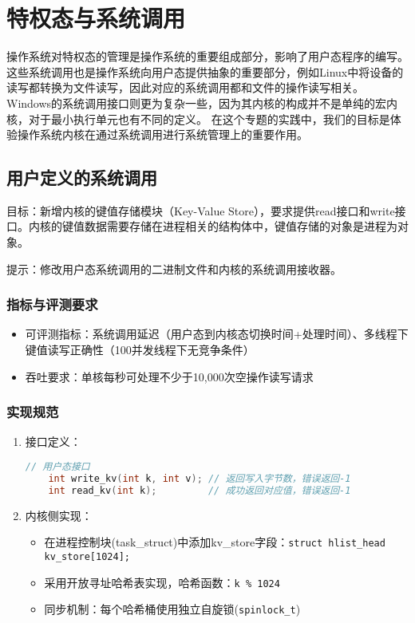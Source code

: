 \chapter{特权态与系统调用}
操作系统对特权态的管理是操作系统的重要组成部分，影响了用户态程序的编写。
这些系统调用也是操作系统向用户态提供抽象的重要部分，例如Linux中将设备的读写都转换为文件读写，因此对应的系统调用都和文件的操作读写相关。Windows的系统调用接口则更为复杂一些，因为其内核的构成并不是单纯的宏内核，对于最小执行单元也有不同的定义。
在这个专题的实践中，我们的目标是体验操作系统内核在通过系统调用进行系统管理上的重要作用。


\section{用户定义的系统调用}
目标：新增内核的键值存储模块（Key-Value Store），要求提供read接口和write接口。内核的键值数据需要存储在进程相关的结构体中，键值存储的对象是进程为对象。

提示：修改用户态系统调用的二进制文件和内核的系统调用接收器。

\subsection*{指标与评测要求}
\begin{itemize}
    \item 可评测指标：系统调用延迟（用户态到内核态切换时间+处理时间）、多线程下键值读写正确性（100并发线程下无竞争条件）
    \item 吞吐要求：单核每秒可处理不少于10,000次空操作读写请求
\end{itemize}

\subsection*{实现规范}
\begin{enumerate}
    \item 接口定义：
    \begin{lstlisting}[language=C]
    // 用户态接口
    int write_kv(int k, int v); // 返回写入字节数，错误返回-1
    int read_kv(int k);         // 成功返回对应值，错误返回-1
    \end{lstlisting}
    
    \item 内核侧实现：
    \begin{itemize}
        \item 在进程控制块(task\_struct)中添加kv\_store字段：\texttt{struct hlist\_head kv\_store[1024];}
        \item 采用开放寻址哈希表实现，哈希函数：\texttt{k \% 1024}
        \item 同步机制：每个哈希桶使用独立自旋锁(\texttt{spinlock\_t})
    \end{itemize}
    
\end{enumerate}

